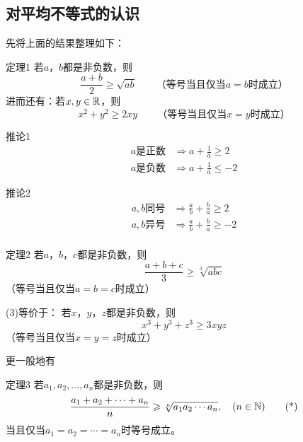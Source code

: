 \subsection{对平均不等式的认识}
先将上面的结果整理如下：
\begin{thm}{定理1}
    若$a$，$b$都是非负数，则
\begin{equation}
    \frac{a+b}{2}\ge \sqrt{ab}\qquad 
\text{（等号当且仅当$a=b$时成立）}\tag{1}
\end{equation}
进而还有：若$x,y\in\mathbb{R}$，则
\begin{equation}
    x^2+y^2\ge 2xy\qquad \text{（等号当且仅当$x=y$时成立）}\tag{2}
\end{equation}
\end{thm}

\begin{thm}{推论1 }
\[\begin{split}
    a\text{是正数}&\Longrightarrow a+\frac{1}{a}\ge 2\\
    a\text{是负数}&\Longrightarrow a+\frac{1}{a}\le -2
\end{split}\]
\end{thm}

\begin{thm}{推论2}
\[\begin{split}
    a,b\text{同号}&\Longrightarrow \frac{a}{b}+\frac{b}{a}\ge 2\\
a,b\text{异号} &\Longrightarrow \frac{a}{b}+\frac{b}{a}\ge -2\\
\end{split}\]
\end{thm}

\begin{thm}{定理2}
    若$a$，$b$，$c$都是非负数，则
\begin{equation}
    \frac{a+b+c}{3}\ge \sqrt[3]{abc}\tag{3}
\end{equation}
（等号当且仅当$a=b=c$时成立）
\end{thm}

(3)等价于：
若$x$，$y$，$z$都是非负数，则
\begin{equation}
    x^3+y^3+z^3\ge 3xyz \tag{4}
\end{equation}
（等号当且仅当$x=y=z$时成立）

更一般地有

\begin{thm}{定理3}
    若$a_1,a_2,\ldots,a_n$都是非负数，则
    \begin{equation}
\dfrac{a_1+a_2+\cdots +a_n}{n}\geqslant \sqrt[n]{a_1a_2\cdots a_n},\quad (n\in\mathbb{N})       \tag{*}
    \end{equation}
当且仅当$a_1=a_2=\cdots= a_n$时等号成立。
\end{thm}
 
